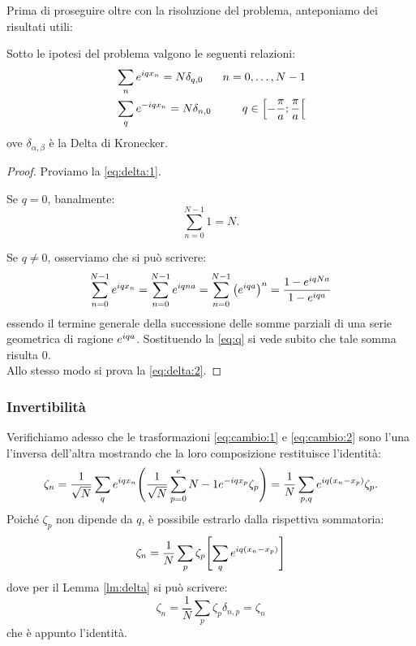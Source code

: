         \par Prima di proseguire oltre con la risoluzione del problema, anteponiamo dei risultati utili:
        \begin{lemma} \label{lm:delta}
            Sotto le ipotesi del problema valgono le seguenti relazioni:
            \begin{align}
                &\sum_{n}e^{iqx_n}=N\delta_{q,0} &n=0,\dots,N-1 \label{eq:delta:1}\\
                &\sum_{q}e^{-iqx_n}=N\delta_{n,0} &q\in\left[-\frac{\pi}{a};\frac{\pi}{a}\right[ \label{eq:delta:2}
            \end{align}
        ove $\delta_{\alpha,\beta}$ \`e la Delta di Kronecker.
        \end{lemma}
        \begin{proof}
            Proviamo la \eqref{eq:delta:1}.
            \par Se $q=0$, banalmente:
                $$\sum_{n=0}^{N-1}1=N.$$
            \par Se $q\neq0$, osserviamo che si pu\`o scrivere:
                $$\sum_{n=0}^{N-1} e^{iqx_n}=\sum_{n=0}^{N-1} e^{iqna}=\sum_{n=0}^{N-1}\qty(e^{iqa})^n=\frac{1-e^{iqNa}}{1-e^{iqa}}$$
            essendo il termine generale della successione delle somme parziali di una serie geometrica di ragione $e^{iqa}$. Sostituendo la \eqref{eq:q} si vede subito che tale somma risulta $0$. \\ Allo stesso modo si prova la \eqref{eq:delta:2}.
        \end{proof}
        \subsubsection{Invertibilit\`a}
            Verifichiamo adesso che le trasformazioni \eqref{eq:cambio:1} e \eqref{eq:cambio:2} sono l'una l'inversa dell'altra mostrando che la loro composizione restituisce l'identit\`a: $$\zeta_n=\frac{1}{\sqrt{N}}\sum_{q}e^{iqx_n}\qty(\frac{1}{\sqrt{N}}\sum_{p=0}^e{N-1}e^{-iqx_p}\zeta_p)=\frac{1}{N}\sum_{p,q}e^{iq\qty(x_n-x_p)}\zeta_p.$$ Poich\'e $\zeta_p$ non dipende da $q$, \`e possibile estrarlo dalla rispettiva sommatoria:
                $$\zeta_n=\frac{1}{N}\sum_p\zeta_p\qty[\sum_q e^{iq\qty(x_n-x_p)}]$$
            dove per il Lemma \ref{lm:delta} si pu\`o scrivere:
                $$\zeta_n=\frac{1}{N}\sum_p\zeta_p\delta_{n,p}=\zeta_n$$
            che \`e appunto l'identit\`a.
